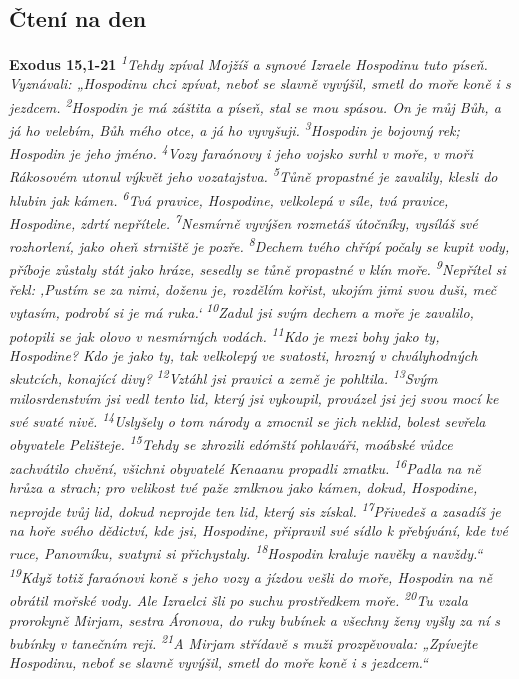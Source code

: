 \documentclass[11pt]{article}
\begin{document}
\subsection*{Čtení na den}
\textbf{Exodus 15,1-21}
\newline
\textit{
\textsuperscript{1}Tehdy zpíval Mojžíš a synové Izraele Hospodinu tuto píseň. Vyznávali: „Hospodinu chci zpívat, neboť se slavně vyvýšil, smetl do moře koně i s jezdcem.
\textsuperscript{2}Hospodin je má záštita a píseň, stal se mou spásou. On je můj Bůh, a já ho velebím, Bůh mého otce, a já ho vyvyšuji.
\textsuperscript{3}Hospodin je bojovný rek; Hospodin je jeho jméno.
\textsuperscript{4}Vozy faraónovy i jeho vojsko svrhl v moře, v moři Rákosovém utonul výkvět jeho vozatajstva.
\textsuperscript{5}Tůně propastné je zavalily, klesli do hlubin jak kámen.
\textsuperscript{6}Tvá pravice, Hospodine, velkolepá v síle, tvá pravice, Hospodine, zdrtí nepřítele.
\textsuperscript{7}Nesmírně vyvýšen rozmetáš útočníky, vysíláš své rozhorlení, jako oheň strniště je pozře.
\textsuperscript{8}Dechem tvého chřípí počaly se kupit vody, příboje zůstaly stát jako hráze, sesedly se tůně propastné v klín moře.
\textsuperscript{9}Nepřítel si řekl: ‚Pustím se za nimi, doženu je, rozdělím kořist, ukojím jimi svou duši, meč vytasím, podrobí si je má ruka.‘
\textsuperscript{10}Zadul jsi svým dechem a moře je zavalilo, potopili se jak olovo v nesmírných vodách.
\textsuperscript{11}Kdo je mezi bohy jako ty, Hospodine? Kdo je jako ty, tak velkolepý ve svatosti, hrozný v chvályhodných skutcích, konající divy?
\textsuperscript{12}Vztáhl jsi pravici a země je pohltila.
\textsuperscript{13}Svým milosrdenstvím jsi vedl tento lid, který jsi vykoupil, provázel jsi jej svou mocí ke své svaté nivě.
\textsuperscript{14}Uslyšely o tom národy a zmocnil se jich neklid, bolest sevřela obyvatele Pelišteje.
\textsuperscript{15}Tehdy se zhrozili edómští pohlaváři, moábské vůdce zachvátilo chvění, všichni obyvatelé Kenaanu propadli zmatku.
\textsuperscript{16}Padla na ně hrůza a strach; pro velikost tvé paže zmlknou jako kámen, dokud, Hospodine, neprojde tvůj lid, dokud neprojde ten lid, který sis získal.
\textsuperscript{17}Přivedeš a zasadíš je na hoře svého dědictví, kde jsi, Hospodine, připravil své sídlo k přebývání, kde tvé ruce, Panovníku, svatyni si přichystaly.
\textsuperscript{18}Hospodin kraluje navěky a navždy.“
\textsuperscript{19}Když totiž faraónovi koně s jeho vozy a jízdou vešli do moře, Hospodin na ně obrátil mořské vody. Ale Izraelci šli po suchu prostředkem moře.
\textsuperscript{20}Tu vzala prorokyně Mirjam, sestra Áronova, do ruky bubínek a všechny ženy vyšly za ní s bubínky v tanečním reji.
\textsuperscript{21}A Mirjam střídavě s muži prozpěvovala: „Zpívejte Hospodinu, neboť se slavně vyvýšil, smetl do moře koně i s jezdcem.“
}
\end{document}
